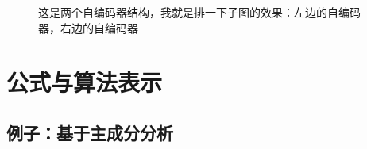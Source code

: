 \documentclass[a4paper,AutoFakeBold,oneside,12pt]{book}
\begin{document}
\begin{figure}[!htbp]
    \centering
    \quad %
    \caption{这是两个自编码器结构，我就是排一下子图的效果：\protect{}左边的自编码器，\protect{}右边的自编码器} %
    \label{Fig:RecAccuracy} %
\end{figure}

\section{公式与算法表示}

\subsection{例子：基于主成分分析}
\end{document}
